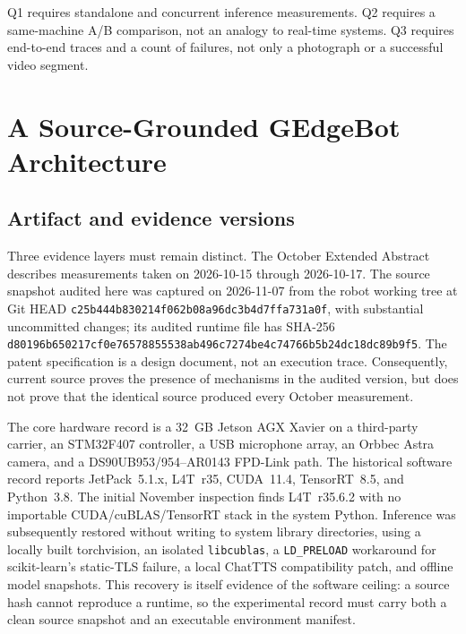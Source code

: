 \documentclass[conference]{IEEEtran}
\newcommand{\code}[1]{\texttt{#1}}
\begin{document}
Q1 requires standalone and concurrent inference measurements. Q2 requires a same-machine A/B comparison, not an analogy to real-time systems. Q3 requires end-to-end traces and a count of failures, not only a photograph or a successful video segment.

\section{A Source-Grounded GEdgeBot Architecture}


\subsection{Artifact and evidence versions}
Three evidence layers must remain distinct. The October Extended Abstract describes measurements taken on 2026-10-15 through 2026-10-17. The source snapshot audited here was captured on 2026-11-07 from the robot working tree at Git HEAD \code{c25b444b830214f062b08a96dc3b4d7ffa731a0f}, with substantial uncommitted changes; its audited runtime file has SHA-256 \code{d80196b650217cf0e76578855538ab496c}\allowbreak\code{7274be4c74766b5b24dc18dc89b9f5}. The patent specification is a design document, not an execution trace. Consequently, current source proves the presence of mechanisms in the audited version, but does not prove that the identical source produced every October measurement.

The core hardware record is a 32~GB Jetson AGX Xavier on a third-party carrier, an STM32F407 controller, a USB microphone array, an Orbbec Astra camera, and a DS90UB953/954--AR0143 FPD-Link path. The historical software record reports JetPack~5.1.x, L4T~r35, CUDA~11.4, TensorRT~8.5, and Python~3.8. The initial November inspection finds L4T~r35.6.2 with no importable CUDA/cuBLAS/TensorRT stack in the system Python. Inference was subsequently restored without writing to system library directories, using a locally built torchvision, an isolated \code{libcublas}, a \code{LD\_PRELOAD} workaround for scikit-learn's static-TLS failure, a local ChatTTS compatibility patch, and offline model snapshots. This recovery is itself evidence of the software ceiling: a source hash cannot reproduce a runtime, so the experimental record must carry both a clean source snapshot and an executable environment manifest.
\end{document}
